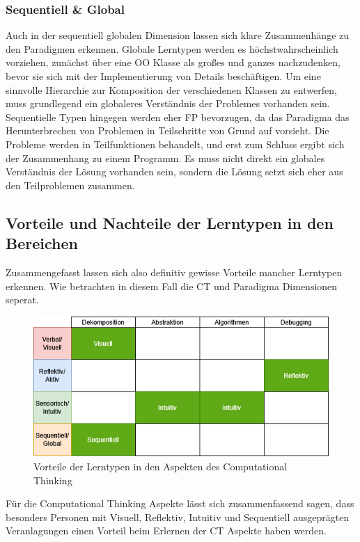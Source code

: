 \subsubsection{Sequentiell & Global}
Auch in der sequentiell globalen Dimension lassen sich klare Zusammenhänge zu den Paradigmen erkennen. Globale Lerntypen werden es höchstwahrscheinlich vorziehen, zunächst über eine OO Klasse als großes und ganzes nachzudenken, bevor sie sich mit der Implementierung von Details beschäftigen. Um eine sinnvolle Hierarchie zur Komposition der verschiedenen Klassen zu entwerfen, muss grundlegend ein globaleres Verständnis der Problemes vorhanden sein.
Sequentielle Typen hingegen werden eher FP bevorzugen, da das Paradigma das Herunterbrechen von Problemen in Teilschritte von Grund auf vorsieht. Die Probleme werden in Teilfunktionen behandelt, und erst zum Schluss ergibt sich der Zusammenhang zu einem Programm. Es muss nicht direkt ein globales Verständnis der Lösung vorhanden sein, sondern die Lösung setzt sich eher aus den Teilproblemen zusammen.

\subsection{Vorteile und Nachteile der Lerntypen in den Bereichen}
Zusammengefasst lassen sich also definitiv gewisse Vorteile mancher Lerntypen erkennen. Wie betrachten in diesem Fall die CT und Paradigma Dimensionen seperat.

\begin{figure}[h!]
    \centering
    \includegraphics[width=1\linewidth]{Figures/Styles_CT}
    \caption{Vorteile der Lerntypen in den Aspekten des Computational Thinking}
\end{figure}

Für die Computational Thinking Aspekte lässt sich zusammenfassend sagen, dass besonders Personen mit Visuell, Reflektiv, Intuitiv und Sequentiell ausgeprägten Veranlagungen einen Vorteil beim Erlernen der CT Aspekte haben werden.

